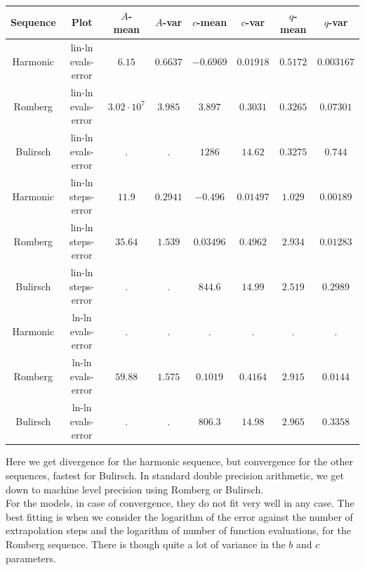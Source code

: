 \begin{table}[H]
    \centering
        \small
    \begin{tabular}{c|c||c|c|c|c|c	|c}
Sequence & Plot & \(A\)-mean & \(A\)-var & \(c\)-mean & \(c\)-var & \(q\)-mean & \(q\)-var\\\hline
Harmonic & lin-ln evals-error & \(6.15\) & \(0.6637\) & \(-0.6969\) & \(0.01918\) & \(0.5172\) & \(0.003167\) \\
Romberg & lin-ln evals-error & \(3.02\cdot 10^{7}\) & \(3.985\) & \(3.897\) & \(0.3031\) & \(0.3265\) & \(0.07301\) \\
Bulirsch & lin-ln evals-error & \(.\) & \(.\) & \(1286\) & \(14.62\) & \(0.3275\) & \(0.744\) \\
Harmonic & lin-ln steps-error & \(11.9\) & \(0.2941\) & \(-0.496\) & \(0.01497\) & \(1.029\) & \(0.00189\) \\
Romberg & lin-ln steps-error & \(35.64\) & \(1.539\) & \(0.03496\) & \(0.4962\) & \(2.934\) & \(0.01283\) \\
Bulirsch & lin-ln steps-error & \(.\) & \(.\) & \(844.6\) & \(14.99\) & \(2.519\) & \(0.2989\) \\
Harmonic & ln-ln evals-error & . & . & . & . & . & . \\
Romberg & ln-ln evals-error & \(59.88\) & \(1.575\) & \(0.1019\) & \(0.4164\) & \(2.915\) & \(0.0144\) \\
Bulirsch & ln-ln evals-error & \(.\) & \(.\) & \(806.3\) & \(14.98\) & \(2.965\) & \(0.3358\) \\
    \end{tabular}
    \label{tab:my_label}
\end{table}

Here we get divergence for the harmonic sequence, but convergence for the other sequences, fastest for Bulirsch. In standard double precision arithmetic, we get down to machine level precision using Romberg or Bulirsch.\\

For the models, in case of convergence, they do not fit very well in any case. The best fitting is when we consider the logarithm of the error against the number of extrapolation steps and the logarithm of number of function evaluations, for the Romberg sequence. There is though quite a lot of variance in the \(b\) and \(c\) parameters.

